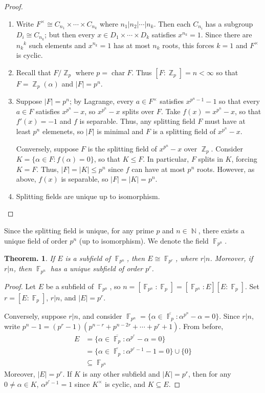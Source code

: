 \documentclass[11pt, a4paper]{memoir}
\DeclareMathOperator{\N}{{\mathbb{N}}}
\DeclareMathOperator{\Z}{{\mathbb{Z}}}
\DeclareMathOperator{\F}{{\mathbb{F}}}
\theoremstyle{change}
\newtheorem{theorem}{Theorem.}[section]
\theoremstyle{plain}
\theoremstyle{nonumberplain}
\newtheorem{proof}{Proof}
\DeclareMathOperator{\chr}{char}
\numberwithin{equation}{section}
\begin{document}
\begin{proof}
    \begin{enumerate}[nl]
        \item Write $F^\times\cong C_{n_1}\times\cdots\times C_{n_k}$ where $n_1|n_2|\cdots|n_k$.
            Then each $C_{n_i}$ has a subgroup $D_i\cong C_{n_k}$; but then every $x\in D_1\times\cdots\times D_k$ satisfies $x^{n_k}=1$.
            Since there are ${n_k}^k$ such elements and $x^{n_k}=1$ has at most $n_k$ roots, this forces $k=1$ and $F^\times$ is cyclic.
        \item Recall that $F/\Z_p$ where $p=\chr F$.
            Thus $[F:\Z_p]=n<\infty$ so that $F=\Z_p(\alpha)$ and $|F|=p^n$.
        \item Suppose $|F|=p^n$; by Lagrange, every $a\in F^\times$ satisfies $x^{p^n-1}-1$ so that every $a\in F$ satisfies $x^{p^n}-x$, so $x^{p^n}-x$ splits over $F$.
            Take $f(x)=x^{p^n}-x$, so that $f'(x)=-1$ and $f$ is separable.
            Thus, any splitting field $F$ must have at least $p^n$ elemenets, so $|F|$ is minimal and $F$ is a splitting field of $x^{p^n}-x$.

            Conversely, suppose $F$ is the splitting field of $x^{p^n}-x$ over $\Z_p$.
            Consider $K=\{\alpha\in F:f(\alpha)=0\}$, so that $K\leq F$.
            In particular, $F$ splits in $K$, forcing $K=F$.
            Thus, $|F|=|K|\leq p^n$ since $f$ can have at most $p^n$ roots.
            However, as above, $f(x)$ is separable, so $|F|=|K|=p^n$.
        \item Splitting fields are unique up to isomorphism.
    \end{enumerate}
\end{proof}
Since the splitting field is unique, for any prime $p$ and $n\in\N$, there exists a unique field of order $p^n$ (up to isomorphism).
We denote the field $\F_{p^n}$.
\begin{theorem}
    If $E$ is a subfield of $\F_{p^n}$, then $E\cong \F_{p^r}$, where $r|n$.
    Moreover, if $r|n$, then $\F_{p^n}$ has a unique subfield of order $p^r$.
\end{theorem}
\begin{proof}
    Let $E$ be a subfield of $\F_{p^n}$, so $n=[\F_{p^n}:\F_p]=[\F_{p^n}:E][E:\F_p]$.
    Set $r=[E:\F_p]$, $r|n$, and $|E|=p^r$.

    Conversely, suppose $r|n$, and consider $\F_{p^n}=\{\alpha\in\overline{\F_p}:\alpha^{p^n}-\alpha=0\}$.
    Since $r|n$, write $p^n-1=(p^r-1)(p^{n-r}+p^{n-2r}+\cdots+p^r+1)$.
    From before,
    \begin{align*}
        E &= \{\alpha\in\overline{\F_p}:\alpha^{p^r}-\alpha=0\}\\
          &= \{\alpha\in\overline{\F_p}:\alpha^{p^r-1}-1=0\}\cup\{0\}\\
          &\subseteq\F_{p^n}
    \end{align*}
    Moreover, $|E|=p^r$.
    If $K$ is any other subfield and $|K|=p^r$, then for any $0\neq\alpha\in K$, $\alpha^{p^r-1}=1$ since $K^\times$ is cyclic, and $K\subseteq E$.
\end{proof}
\end{document}
